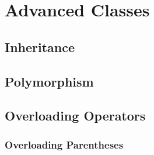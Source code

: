 \chapter{Advanced Classes}
\section{Inheritance}
\section{Polymorphism}
\section{Overloading Operators}
\subsection{Overloading Parentheses}
\label{functionobjects}
